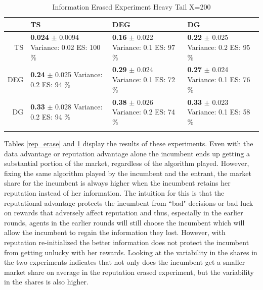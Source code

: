 \documentclass{article}
\theoremstyle{definition}
\begin{document}
\begin{table}[ht]
\centering
\caption{Information Erased Experiment Heavy Tail X=200} 
\begin{tabular}{rlll}
  \hline
 & TS & DEG &  DG \\ 
  \hline
TS & \makecell{\textbf{ 0.024 } $\pm$ 0.0094 \\Variance: 0.02 \\ ES: 100 \%} & \makecell{\textbf{ 0.16 } $\pm$ 0.022 \\Variance: 0.1 \\ ES: 97 \%} & \makecell{\textbf{ 0.22 } $\pm$ 0.025 \\Variance: 0.2 \\ ES: 95 \%} \\ 
  DEG & \makecell{\textbf{ 0.24 } $\pm$ 0.025 \\Variance: 0.2 \\ ES: 94 \%} & \makecell{\textbf{ 0.29 } $\pm$ 0.024 \\Variance: 0.1 \\ ES: 72 \%} & \makecell{\textbf{ 0.27 } $\pm$ 0.024 \\Variance: 0.1 \\ ES: 76 \%} \\ 
   DG & \makecell{\textbf{ 0.33 } $\pm$ 0.028 \\Variance: 0.2 \\ ES: 94 \%} & \makecell{\textbf{ 0.38 } $\pm$ 0.026 \\Variance: 0.2 \\ ES: 74 \%} & \makecell{\textbf{ 0.33 } $\pm$ 0.023 \\Variance: 0.1 \\ ES: 58 \%} \\ 
   \hline
   \label{info_erase}
\end{tabular}
\end{table}

Tables \ref{rep_erase} and \ref{info_erase} display the results of these experiments. Even with the data advantage or reputation advantage alone the incumbent ends up getting a substantial portion of the market, regardless of the algorithm played. However, fixing the same algorithm played by the incumbent and the entrant, the market share for the incumbent is always higher when the incumbent retains her reputation instead of her information. The intuition for this is that the reputational advantage protects the incumbent from ``bad" decisions or bad luck on rewards that adversely affect reputation and thus, especially in the earlier rounds, agents in the earlier rounds will still choose the incumbent which will allow the incumbent to regain the information they lost. However, with reputation re-initialized the better information does not protect the incumbent from getting unlucky with her rewards. Looking at the variability in the shares in the two experiments indicates that not only does the incumbent get a smaller market share on average in the reputation erased experiment, but the variability in the shares is also higher.
\end{document}
